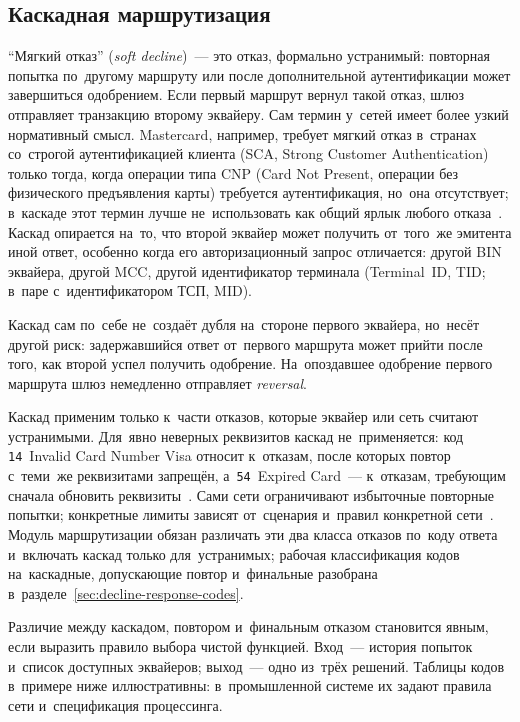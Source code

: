 \subsection*{Каскадная маршрутизация}

\enquote{Мягкий отказ} (\textit{soft decline})~--- это отказ, формально устранимый:
повторная попытка по~другому маршруту или после дополнительной аутентификации
может завершиться одобрением. Если первый маршрут вернул такой отказ, шлюз
отправляет транзакцию второму эквайеру. Сам термин у~сетей имеет более узкий
нормативный смысл. Mastercard, например, требует мягкий отказ в~странах
со~строгой аутентификацией клиента (SCA, Strong Customer Authentication) только
тогда, когда операции типа CNP (Card Not Present, операции без физического
предъявления карты) требуется аутентификация, но~она отсутствует; в~каскаде
этот термин лучше не~использовать как общий ярлык любого
отказа~\cite{mc-tpr}. Каскад опирается на~то, что второй эквайер
может получить от~того~же эмитента иной ответ,
особенно когда его авторизационный запрос отличается: другой BIN эквайера,
другой MCC, другой идентификатор терминала (Terminal~ID, TID; в~паре
с~идентификатором ТСП, MID).


Каскад сам по~себе не~создаёт дубля на~стороне первого эквайера, но~несёт
другой риск: задержавшийся ответ от~первого маршрута может прийти после того,
как второй успел получить одобрение. На~опоздавшее одобрение первого маршрута
шлюз немедленно отправляет \textit{reversal}.

Каскад применим только к~части отказов, которые эквайер или сеть считают
устранимыми. Для~явно неверных реквизитов каскад не~применяется: код
\texttt{14}~Invalid Card Number Visa относит к~отказам, после которых повтор
с~теми~же реквизитами запрещён, а~\texttt{54}~Expired Card~--- к~отказам,
требующим сначала обновить реквизиты~\cite{visa-core-rules}.
Сами сети ограничивают избыточные повторные попытки; конкретные лимиты зависят
от~сценария и~правил конкретной сети~\cite{mc-tpr}. Модуль маршрутизации
обязан различать эти два класса отказов по~коду ответа и~включать каскад только
для~устранимых; рабочая классификация кодов на~каскадные, допускающие повтор
и~финальные разобрана в~разделе~\ref{sec:decline-response-codes}.

Различие между каскадом, повтором и~финальным отказом становится явным, если выразить
правило выбора чистой функцией. Вход~--- история попыток и~список доступных
эквайеров; выход~--- одно из~трёх решений. Таблицы кодов в~примере ниже
иллюстративны: в~промышленной системе их задают правила сети и~спецификация
процессинга.

